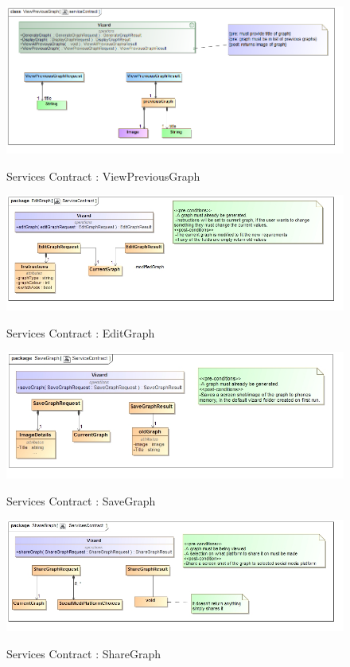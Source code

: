 \documentclass[a4paper,12pt]{article}
\begin{document}
	\begin{figure}[H]
		\includegraphics[width=\textwidth]{Images/class__ViewPreviousGraph__serviceContract.png}  \\
		\caption{Services Contract : ViewPreviousGraph}
	\end{figure}
	
	\begin{figure}[H]
		\includegraphics[width=\textwidth]{Images/class__EditGraph}  \\
		\caption{Services Contract : EditGraph}
	\end{figure}
	
	\begin{figure}[H]
		\includegraphics[width=\textwidth]{Images/class__SaveGraph}  \\
		\caption{Services Contract : SaveGraph}
	\end{figure}
	
	\begin{figure}[H]
		\includegraphics[width=\textwidth]{Images/class__ShareGraph}  \\
		\caption{Services Contract : ShareGraph}
	\end{figure}
\end{document}
